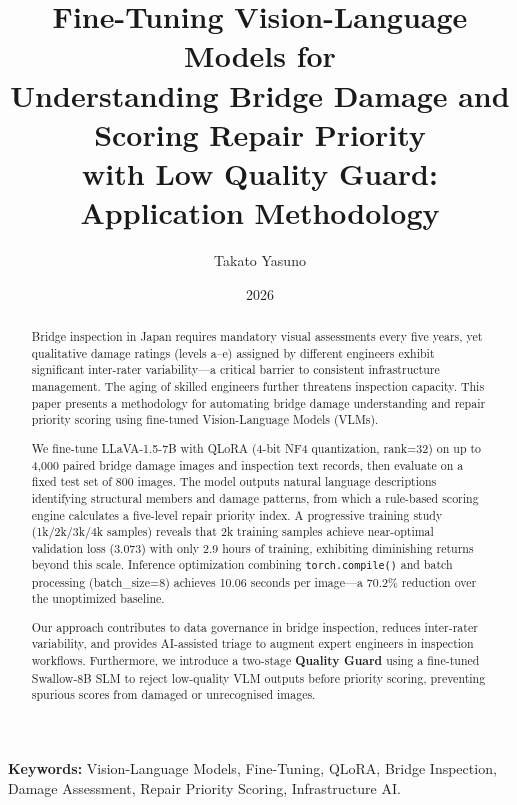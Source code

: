 \documentclass[twocolumn]{article}
\title{Fine-Tuning Vision-Language Models for\\[2pt]
Understanding Bridge Damage and Scoring Repair Priority\\[2pt]
with Low Quality Guard: Application Methodology}
\author[1]{Takato Yasuno}
\date{2026}
\begin{document}
\renewcommand{\abstractname}{Abstract}
\renewcommand{\refname}{References}
\renewcommand{\figurename}{Figure}
\renewcommand{\tablename}{Table}

\maketitle

\begin{abstract}

Bridge inspection in Japan requires mandatory visual assessments every five years,
yet qualitative damage ratings (levels a--e) assigned by different engineers exhibit
significant inter-rater variability---a critical barrier to consistent infrastructure
management. The aging of skilled engineers further threatens inspection capacity.
This paper presents a methodology for automating bridge damage understanding and
repair priority scoring using fine-tuned Vision-Language Models (VLMs).

We fine-tune LLaVA-1.5-7B with QLoRA (4-bit NF4 quantization, rank=32) on
up to 4{,}000 paired bridge damage images and inspection text records, then
evaluate on a fixed test set of 800 images. The model outputs natural language
descriptions identifying structural members and damage patterns, from which
a rule-based scoring engine calculates a five-level repair priority index.
A progressive training study (1k/2k/3k/4k samples) reveals that 2k training
samples achieve near-optimal validation loss (3.073) with only 2.9 hours of
training, exhibiting diminishing returns beyond this scale.
Inference optimization combining \texttt{torch.compile()} and batch processing
(batch\_size=8) achieves 10.06 seconds per image---a 70.2\% reduction over the
unoptimized baseline.

Our approach contributes to data governance in bridge inspection, reduces
inter-rater variability, and provides AI-assisted triage to augment
expert engineers in inspection workflows.
Furthermore, we introduce a two-stage \textbf{Quality Guard} using a
fine-tuned Swallow-8B SLM to reject low-quality VLM outputs before
priority scoring, preventing spurious scores from damaged or unrecognised images.

\end{abstract}

\noindent
\textbf{Keywords:} Vision-Language Models, Fine-Tuning, QLoRA, Bridge Inspection,
Damage Assessment, Repair Priority Scoring, Infrastructure AI.
\end{document}
